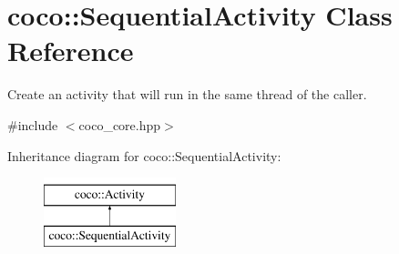 \hypertarget{classcoco_1_1_sequential_activity}{}\section{coco\+:\+:Sequential\+Activity Class Reference}
\label{classcoco_1_1_sequential_activity}


Create an activity that will run in the same thread of the caller.  




{\ttfamily \#include $<$coco\+\_\+core.\+hpp$>$}

Inheritance diagram for coco\+:\+:Sequential\+Activity\+:\begin{figure}[H]
\begin{center}
\leavevmode
\includegraphics[height=2.000000cm]{classcoco_1_1_sequential_activity}
\end{center}
\end{figure}
